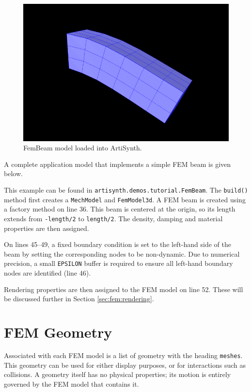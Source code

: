 \begin{figure}[ht]
	\centering
	\includegraphics[width=\imglength]{images/FemBeam}
	\caption{FemBeam model loaded into ArtiSynth.}
	\label{fig:fem:beam}
\end{figure}

A complete application model that implements a simple FEM beam is given below.
\lstset{numbers=left}

\lstset{numbers=none}
This example can be found in {\tt artisynth.demos.tutorial.FemBeam}.  The 
{\tt build()} method first creates a {\tt MechModel} and {\tt FemModel3d}.
A FEM beam is created using a factory method on line 36.  This beam is
centered at the origin, so its length extends from {\tt-length/2} to 
{\tt length/2}.  The density, damping and material properties are then 
assigned.  

On lines 45--49, a fixed boundary condition is set to the left-hand side 
of the beam by setting the corresponding nodes to be non-dynamic.  Due to 
numerical precision, a small {\tt EPSILON} buffer is required to ensure 
all left-hand boundary nodes are identified (line 46).

Rendering properties are then assigned to the FEM model on line 52.  These 
will be discussed further in Section \ref{sec:fem:rendering}.

\section{FEM Geometry}
\label{sec:fem:geometry}

Associated with each FEM model is a list of geometry with the heading 
{\tt meshes}.  This geometry can be used for either display purposes, 
or for interactions such as collisions.  A geometry itself has no 
physical properties; its motion is entirely governed by the FEM model 
that contains it.  

